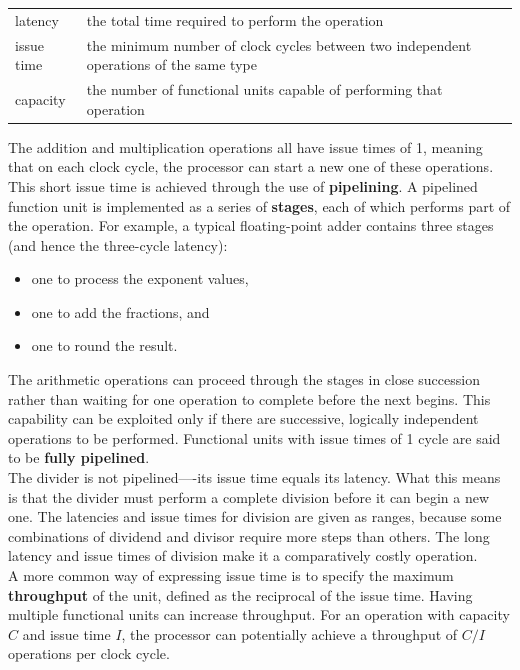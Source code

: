 \documentclass[11pt]{article}
\begin{document}
\begin{center}
\begin{tabular}{ll}
latency & the total time required to perform the operation\\
issue time & the minimum number of clock cycles between two independent operations of the same type\\
capacity & the number of functional units capable of performing that operation\\
\end{tabular}
\end{center}


The addition and multiplication operations all have issue times of 1, meaning that on each clock cycle, the processor can start a new one of these operations. This short issue time is achieved through the use of \textbf{pipelining}. A pipelined function unit is implemented as a series of \textbf{stages}, each of which performs part of the operation. For example, a typical floating-point adder contains three stages (and hence the three-cycle latency):\\
\begin{itemize}
\item one to process the exponent values,\\
\item one to add the fractions, and\\
\item one to round the result.\\
\end{itemize}
The arithmetic operations can proceed through the stages in close succession rather than waiting for one operation to complete before the next begins. This capability can be exploited only if there are successive, logically independent operations to be performed. Functional units with issue times of 1 cycle are said to be \textbf{fully pipelined}.\\

The divider is not pipelined—-its issue time equals its latency. What this means is that the divider must perform a complete division before it can begin a new one. The latencies and issue times for division are given as ranges, because some combinations of dividend and divisor require more steps than others. The long latency and issue times of division make it a comparatively costly operation.\\

A more common way of expressing issue time is to specify the maximum \textbf{throughput} of the unit, defined as the reciprocal of the issue time. Having multiple functional units can increase throughput. For an operation with capacity \(C\) and issue time \(I\), the processor can potentially achieve a throughput of \(C/I\) operations per clock cycle.\\
\end{document}

